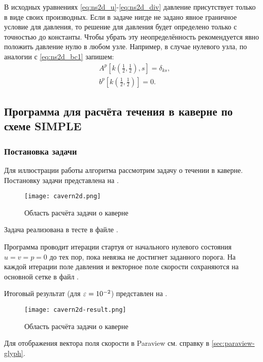 В исходных уравнениях
\eqref{eq:ns2d_u}-\eqref{eq:ns2d_div}
давление присутствует только в виде своих производных.
Если в задаче нигде не задано явное граничное условие
для давления, то решение для давления
будет определено только с точностью до константы.
Чтобы убрать эту неопределённость
рекомендуется явно положить давление нулю
в любом узле. Например, в случае нулевого узла,
по аналогии с \eqref{eq:ns2d_bc1} запишем:
\begin{align}
    \label{eq:ns2d_bc4}
    &A^p[k(\tfrac12, \tfrac12), s] = \delta_{ks}, \\[10pt]
    \nonumber
    &b^{p}[k(\tfrac12, \tfrac12)] = 0.
\end{align}

\subsection{Программа для расчёта течения в каверне по схеме SIMPLE}
\label{sec:prog-cavern2}

\subsubsection{Постановка задачи}

Для иллюстрации работы алгоритма рассмотрим задачу о 
течении в каверне. Постановку задачи представлена на .

\begin{figure}[h]
\centering
\texttt{[image: cavern2d.png]}
\caption{Область расчёта задачи о каверне}
\label{fig:cavern}
\end{figure}

Задача реализована в тесте  в файле .

Программа проводит итерации стартуя от начального нулевого состояния
$u=v=p=0$ до тех пор, пока невязка не достигнет заданного порога.
На каждой итерации поле давления и векторное поле скорости сохраняются
на основной сетке в файл .

Итоговый результат (для $\varepsilon=10^{-2}$) представлен на .

\begin{figure}[h]
\centering
\texttt{[image: cavern2d-result.png]}
\caption{Область расчёта задачи о каверне}
\label{fig:cavern-result}
\end{figure}

Для отображения вектора поля скорости в Paraview см. справку в \ref{sec:paraview-glyph}.

